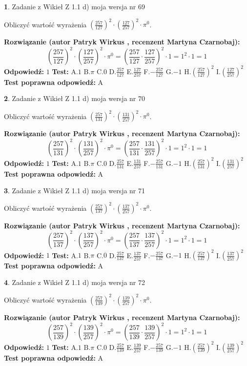 \documentclass[12pt, a4paper]{article}
\theoremstyle{definition} %
\newtheorem{zad}{}
\newcommand{\zadStart}[1]{\begin{zad}#1\newline}
\newcommand{\zadStop}{\end{zad}}
\newcommand{\rozwStart}[2]{\noindent \textbf{Rozwiązanie (autor #1 , recenzent #2): }\newline}
\newcommand{\rozwStop}{\newline}
\newcommand{\odpStart}{\noindent \textbf{Odpowiedź:}\newline}
\newcommand{\odpStop}{\newline}
\newcommand{\testStart}{\noindent \textbf{Test:}\newline}
\newcommand{\testStop}{\newline}
\newcommand{\kluczStart}{\noindent \textbf{Test poprawna odpowiedź:}\newline}
\newcommand{\kluczStop}{\newline}
\begin{document}
\zadStart{Zadanie z Wikieł Z 1.1 d) moja wersja nr 69}

Obliczyć wartość wyrażenia $(\frac{257}{127})^{2} \cdot (\frac{127}{257})^{2} \cdot \pi^{0}$.
\zadStop
\rozwStart{Patryk Wirkus}{Martyna Czarnobaj}
$$(\frac{257}{127})^{2} \cdot (\frac{127}{257})^{2} \cdot \pi^{0} = (\frac{257}{127} \cdot \frac{127}{257})^{2} \cdot 1 = 1^{2} \cdot 1 = 1$$
\rozwStop
\odpStart
$1$
\odpStop
\testStart
A.$1$ B.$\pi$ C.$0$ D.$\frac{257}{127}$ E.$\frac{127}{257}$
F.$-\frac{257}{127}$ G.$-1$
H.$(\frac{257}{127})^{2}$
I.$(\frac{127}{257})^{2}$
\testStop
\kluczStart
A
\kluczStop



\zadStart{Zadanie z Wikieł Z 1.1 d) moja wersja nr 70}

Obliczyć wartość wyrażenia $(\frac{257}{131})^{2} \cdot (\frac{131}{257})^{2} \cdot \pi^{0}$.
\zadStop
\rozwStart{Patryk Wirkus}{Martyna Czarnobaj}
$$(\frac{257}{131})^{2} \cdot (\frac{131}{257})^{2} \cdot \pi^{0} = (\frac{257}{131} \cdot \frac{131}{257})^{2} \cdot 1 = 1^{2} \cdot 1 = 1$$
\rozwStop
\odpStart
$1$
\odpStop
\testStart
A.$1$ B.$\pi$ C.$0$ D.$\frac{257}{131}$ E.$\frac{131}{257}$
F.$-\frac{257}{131}$ G.$-1$
H.$(\frac{257}{131})^{2}$
I.$(\frac{131}{257})^{2}$
\testStop
\kluczStart
A
\kluczStop



\zadStart{Zadanie z Wikieł Z 1.1 d) moja wersja nr 71}

Obliczyć wartość wyrażenia $(\frac{257}{137})^{2} \cdot (\frac{137}{257})^{2} \cdot \pi^{0}$.
\zadStop
\rozwStart{Patryk Wirkus}{Martyna Czarnobaj}
$$(\frac{257}{137})^{2} \cdot (\frac{137}{257})^{2} \cdot \pi^{0} = (\frac{257}{137} \cdot \frac{137}{257})^{2} \cdot 1 = 1^{2} \cdot 1 = 1$$
\rozwStop
\odpStart
$1$
\odpStop
\testStart
A.$1$ B.$\pi$ C.$0$ D.$\frac{257}{137}$ E.$\frac{137}{257}$
F.$-\frac{257}{137}$ G.$-1$
H.$(\frac{257}{137})^{2}$
I.$(\frac{137}{257})^{2}$
\testStop
\kluczStart
A
\kluczStop



\zadStart{Zadanie z Wikieł Z 1.1 d) moja wersja nr 72}

Obliczyć wartość wyrażenia $(\frac{257}{139})^{2} \cdot (\frac{139}{257})^{2} \cdot \pi^{0}$.
\zadStop
\rozwStart{Patryk Wirkus}{Martyna Czarnobaj}
$$(\frac{257}{139})^{2} \cdot (\frac{139}{257})^{2} \cdot \pi^{0} = (\frac{257}{139} \cdot \frac{139}{257})^{2} \cdot 1 = 1^{2} \cdot 1 = 1$$
\rozwStop
\odpStart
$1$
\odpStop
\testStart
A.$1$ B.$\pi$ C.$0$ D.$\frac{257}{139}$ E.$\frac{139}{257}$
F.$-\frac{257}{139}$ G.$-1$
H.$(\frac{257}{139})^{2}$
I.$(\frac{139}{257})^{2}$
\testStop
\kluczStart
A
\kluczStop
\end{document}
